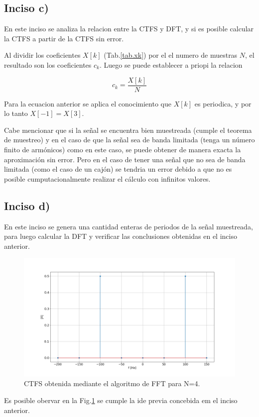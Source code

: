 \documentclass[letterpaper]{article}
\begin{document}
    \subsection*{Inciso c)}

    En este inciso se analiza la relacion entre la CTFS y DFT, y si es posible calcular la CTFS a partir de la CTFS sin error.

    Al dividir los coeficientes $X[k]$ (Tab.\ref{tab.xk}) por el el numero de muestras $N$, el resultado son los coeficientes 
    $c_k$. Luego se puede establecer a priopi la relacion 
    
    \begin{equation}
        c_k = \frac{X[k]}{N}
    \end{equation}

    Para la ecuacion anterior se aplica el conocimiento que $X[k]$ es periodica, y por lo tanto $X[-1]=X[3]$.

    Cabe mencionar que si la señal se encuentra bien muestreada (cumple el teorema de muestreo) y en el caso de que la señal sea de banda limitada (tenga un número finito de 
    armónicos) como en este caso, se puede obtener de manera exacta la aproximación sin error. Pero en el caso de tener una señal que no sea de banda limitada (como el caso de un cajón) se tendria un error debido 
    a que no es posible cumputacionalmente realizar el cálculo con infinitos valores.


    \subsection*{Inciso d)}

    En este inciso se genera una cantidad enteras de periodos de la señal muestreada,
    para luego calcular la DFT y verificar las conclusiones obtenidas en el inciso anterior.

    \begin{figure}[H]
        \centering
        \includegraphics[width=\textwidth]{Img/punto_2_d.png}
        \caption{CTFS obtenida mediante el algoritmo de FFT para N=4.}
        \label{fig.2d}
    \end{figure}
    Es posible obervar en la Fig.\ref{fig.2d} se cumple la ide previa concebida em el inciso anterior.
    
\end{document}

